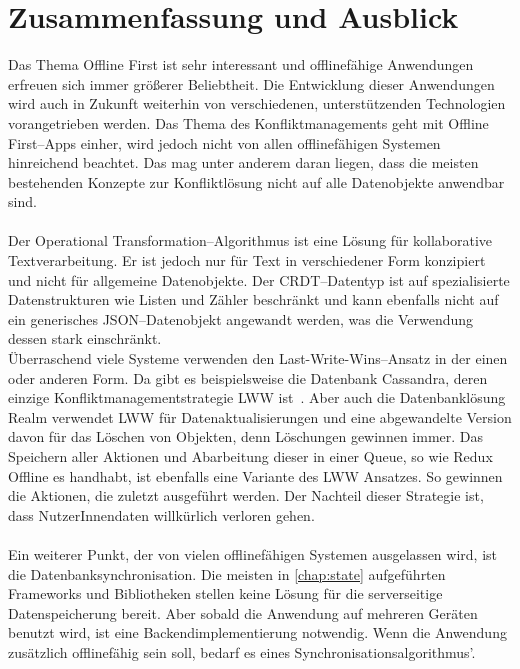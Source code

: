 \chapter{\label{chap:fazit}Zusammenfassung und Ausblick}
Das Thema Offline First ist sehr interessant und offlinefähige Anwendungen erfreuen sich immer größerer Beliebtheit.
Die Entwicklung dieser Anwendungen wird auch in Zukunft weiterhin von verschiedenen, unterstützenden Technologien vorangetrieben werden.
Das Thema des Konfliktmanagements geht mit Offline First--\glspl{App} einher, wird jedoch nicht von allen offlinefähigen Systemen hinreichend beachtet.
Das mag unter anderem daran liegen, dass die meisten bestehenden Konzepte zur Konfliktlösung nicht auf alle Datenobjekte anwendbar sind.\\\\
Der Operational Transformation--Algorithmus ist eine Lösung für kollaborative Textverarbeitung. Er ist jedoch nur für Text in verschiedener Form konzipiert und nicht für allgemeine Datenobjekte.
Der \gls{CRDT}--Datentyp ist auf spezialisierte Datenstrukturen wie Listen und Zähler beschränkt und kann ebenfalls nicht auf ein generisches \gls{JSON}--Datenobjekt angewandt werden, was die Verwendung dessen stark einschränkt.\\
Überraschend viele Systeme verwenden den Last-Write-Wins--Ansatz in der einen oder anderen Form.
Da gibt es beispielsweise die Datenbank Cassandra, deren einzige Konfliktmanagementstrategie \gls{LWW} ist~\cite{cassandralww}.
Aber auch die Datenbanklösung Realm verwendet \gls{LWW} für Datenaktualisierungen und eine abgewandelte Version davon für das Löschen von Objekten, denn Löschungen gewinnen immer.
Das Speichern aller Aktionen und Abarbeitung dieser in einer \gls{Queue}, so wie Redux Offline es handhabt, ist ebenfalls eine Variante des \gls{LWW} Ansatzes.
So gewinnen die Aktionen, die zuletzt ausgeführt werden.
Der Nachteil dieser Strategie ist, dass NutzerInnendaten willkürlich verloren gehen.\\\\
%
%
%
Ein weiterer Punkt, der von vielen offlinefähigen Systemen ausgelassen wird, ist die Datenbanksynchronisation.
Die meisten in \autoref{chap:state} aufgeführten Frameworks und Bibliotheken stellen keine Lösung für die serverseitige Datenspeicherung bereit. 
Aber sobald die Anwendung auf mehreren Geräten benutzt wird, ist eine Backendimplementierung notwendig.
Wenn die Anwendung zusätzlich offlinefähig sein soll, bedarf es eines Synchronisationsalgorithmus'.
